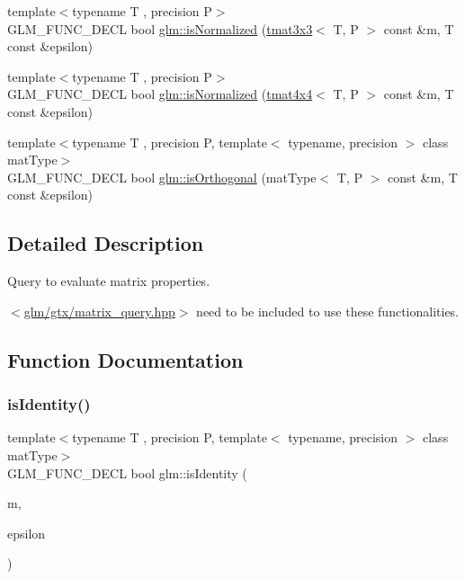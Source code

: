 \begin{DoxyCompactItemize}
\item 
{\footnotesize template$<$typename T , precision P$>$ }\\G\+L\+M\+\_\+\+F\+U\+N\+C\+\_\+\+D\+E\+CL bool \hyperlink{group__gtx__matrix__query_ga351bcc8d485d329b78cfa875e084964d}{glm\+::is\+Normalized} (\hyperlink{structglm_1_1tmat3x3}{tmat3x3}$<$ T, P $>$ const \&m, T const \&epsilon)
\item 
{\footnotesize template$<$typename T , precision P$>$ }\\G\+L\+M\+\_\+\+F\+U\+N\+C\+\_\+\+D\+E\+CL bool \hyperlink{group__gtx__matrix__query_ga934b673ec0e16d79eca0ca9dbb5d6d8b}{glm\+::is\+Normalized} (\hyperlink{structglm_1_1tmat4x4}{tmat4x4}$<$ T, P $>$ const \&m, T const \&epsilon)
\item 
{\footnotesize template$<$typename T , precision P, template$<$ typename, precision $>$ class mat\+Type$>$ }\\G\+L\+M\+\_\+\+F\+U\+N\+C\+\_\+\+D\+E\+CL bool \hyperlink{group__gtx__matrix__query_gab2cb5d23df77b4e4e63ad2965acd31b3}{glm\+::is\+Orthogonal} (mat\+Type$<$ T, P $>$ const \&m, T const \&epsilon)
\end{DoxyCompactItemize}


\subsection{Detailed Description}
Query to evaluate matrix properties. 

$<$\hyperlink{matrix__query_8hpp}{glm/gtx/matrix\+\_\+query.\+hpp}$>$ need to be included to use these functionalities. 

\subsection{Function Documentation}
\mbox{\label{group__gtx__matrix__query_gafc1ce12c738b8c5d007179e615609330}} 
\subsubsection{\texorpdfstring{is\+Identity()}{isIdentity()}}
{\footnotesize\ttfamily template$<$typename T , precision P, template$<$ typename, precision $>$ class mat\+Type$>$ \\
G\+L\+M\+\_\+\+F\+U\+N\+C\+\_\+\+D\+E\+CL bool glm\+::is\+Identity (\begin{DoxyParamCaption}\item[{mat\+Type$<$ T, P $>$ const \&}]{m,  }\item[{T const \&}]{epsilon }\end{DoxyParamCaption})}

